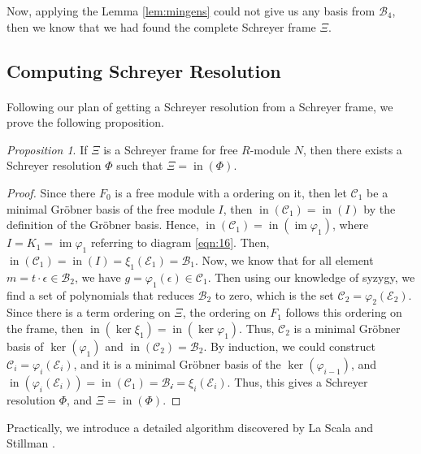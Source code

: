 \documentclass{article}
\newcommand{\im}{\ensuremath{\operatorname{im}}}
\newcommand{\initTerm}{\ensuremath{\operatorname{in}}}
\theoremstyle{definition}
\theoremstyle{remark}
\theoremstyle{example}
\newtheorem{prop}{Proposition}[section]
\begin{document}
Now, applying the Lemma \ref{lem:mingens} could not give us any basis from $\mathcal{B}_4$, then we know that we had found the complete Schreyer frame $\Xi$.

\subsection{Computing Schreyer Resolution}

\paragraph{}

Following our plan of getting a Schreyer resolution from a Schreyer frame, we prove the following proposition.

\begin{prop}
    If $\Xi$ is a Schreyer frame for free $R$-module $N$, then there exists a Schreyer resolution $\Phi$ such that $\Xi = \initTerm (\Phi)$.
\end{prop}


\begin{proof}
    Since there $F_0$ is a free module with a ordering on it, then let $\mathcal{C}_1$ be a minimal Gröbner basis of the free module $I$, then $\initTerm(\mathcal{C}_1) = \initTerm(I)$ by the definition of the Gröbner basis. Hence, $\initTerm(\mathcal{C}_1) = \initTerm (\im \varphi_1)$, where $I = K_1 = \im \varphi_1$ referring to diagram \ref{eqn:16}. Then, $\initTerm(\mathcal{C}_1) = \initTerm (I) = \xi_1(\mathcal{E}_1) = \mathcal{B}_1$. Now, we know that for all element $m = t \cdot \epsilon \in \mathcal{B}_2$, we have $g = \varphi_1(\epsilon) \in \mathcal{C}_1$. Then using our knowledge of syzygy, we find a set of polynomials that reduces $\mathcal{B}_2$ to zero, which is the set $\mathcal{C}_2 = \varphi_2(\mathcal{E}_2)$. Since there is a term ordering on $\Xi$, the ordering on $F_1$ follows this ordering on the frame, then $\initTerm (\ker \xi_1) = \initTerm(\ker \varphi_1)$. Thus, $\mathcal{C}_2$ is a minimal Gröbner basis of $\ker (\varphi_1)$ and $\initTerm(\mathcal{C}_2) = \mathcal{B}_2$. By induction, we could construct $\mathcal{C}_i = \varphi_i(\mathcal{E}_i)$, and it is a minimal Gröbner basis of the $\ker(\varphi_{i-1})$, and $\initTerm (\varphi_i(\mathcal{E}_i)) = \initTerm(\mathcal{C}_1) = \mathcal{B_i} = \xi_i(\mathcal{E}_i)$. Thus, this gives a Schreyer resolution $\Phi$, and $\Xi = \initTerm (\Phi)$.
\end{proof}

Practically, we introduce a detailed algorithm discovered by La Scala and Stillman \cite{la_scala_strategies_1998}.
\end{document}
